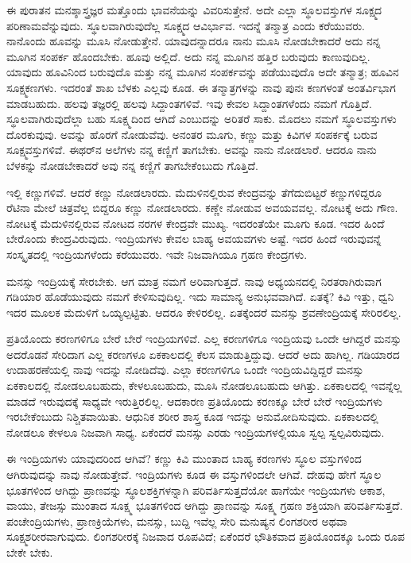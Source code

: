ಈ ಪುರಾತನ ಮನಶ್ಶಾಸ್ತ್ರಜ್ಞರ ಮತ್ತೊಂದು ಭಾವನೆಯನ್ನು ವಿವರಿಸುತ್ತೇನೆ. ಅದೇ ಎಲ್ಲಾ ಸ್ಥೂಲವಸ್ತುಗಳ ಸೂಕ್ಷ್ಮದ ಪರಿಣಾಮವೆನ್ನುವುದು. ಸ್ಥೂಲವಾಗಿರುವುದೆಲ್ಲ ಸೂಕ್ಷ್ಮದ ಆವಿರ್ಭಾವ. ಇದನ್ನೆ ತನ್ಮಾತ್ರ ಎಂದು ಕರೆಯುವರು. ನಾನೊಂದು ಹೂವನ್ನು ಮೂಸಿ ನೋಡುತ್ತೇನೆ. ಯಾವುದನ್ನಾದರೂ ನಾನು ಮೂಸಿ ನೋಡಬೇಕಾದರೆ ಅದು ನನ್ನ ಮೂಗಿನ ಸಂಪರ್ಕ ಹೊಂದಬೇಕು. ಹೂವು ಅಲ್ಲಿದೆ. ಅದು ನನ್ನ ಮೂಗಿನ ಹತ್ತಿರ ಬರುವುದು ಕಾಣುವುದಿಲ್ಲ. ಯಾವುದು ಹೂವಿನಿಂದ ಬರುವುದೊ ಮತ್ತು ನನ್ನ ಮೂಗಿನ ಸಂಪರ್ಕವನ್ನು ಪಡೆಯುವುದೊ ಅದೇ ತನ್ಮಾತ್ರ; ಹೂವಿನ ಸೂಕ್ಷ್ಮಕಣಗಳು. ಇದರಂತೆ ಶಾಖ ಬೆಳಕು ಎಲ್ಲವು ಕೂಡ. ಈ ತನ್ಮಾತ್ರಗಳನ್ನು ನಾವು ಪುನಃ ಕಣಗಳಂತೆ ಅಂತರ್ವಿಭಾಗ ಮಾಡಬಹುದು. ಹಲವು ತಜ್ಞರಲ್ಲಿ ಹಲವು ಸಿದ್ದಾಂತಗಳಿವೆ. ಇವು ಕೇವಲ ಸಿದ್ದಾಂತಗಳೆಂದು ನಮಗೆ ಗೊತ್ತಿದೆ. ಸ್ಥೂಲವಾಗಿರುವುದೆಲ್ಲಾ ಬಹು ಸೂಕ್ಷ್ಮದಿಂದ ಆಗಿದೆ ಎಂಬುದನ್ನು ಅರಿತರೆ ಸಾಕು. ಮೊದಲು ನಮಗೆ ಸ್ಥೂಲವಸ್ತುಗಳು ದೊರಕುವುವು. ಅವನ್ನು ಹೊರಗೆ ನೋಡುವೆವು. ಅನಂತರ ಮೂಗು, ಕಣ್ಣು ಮತ್ತು ಕಿವಿಗಳ ಸಂಪರ್ಕಕ್ಕೆ ಬರುವ ಸೂಕ್ಷ್ಮವಸ್ತುಗಳಿವೆ. ಈಥರ್‌ನ ಅಲೆಗಳು ನನ್ನ ಕಣ್ಣಿಗೆ ತಾಗಬೇಕು. ಅವನ್ನು ನಾನು ನೋಡಲಾರೆ. ಆದರೂ ನಾನು ಬೆಳಕನ್ನು ನೋಡಬೇಕಾದರೆ ಅವು ನನ್ನ ಕಣ್ಣಿಗೆ ತಾಗಬೇಕೆಂಬುದು ಗೊತ್ತಿದೆ.

\newpage

ಇಲ್ಲಿ ಕಣ್ಣುಗಳಿವೆ. ಆದರೆ ಕಣ್ಣು ನೋಡಲಾರದು. ಮೆದುಳಿನಲ್ಲಿರುವ ಕೇಂದ್ರವನ್ನು ತೆಗೆದುಬಿಟ್ಟರೆ ಕಣ್ಣುಗಳಿದ್ದರೂ ರೆಟಿನಾ ಮೇಲೆ ಚಿತ್ರವೆಲ್ಲ ಬಿದ್ದರೂ ಕಣ್ಣು ನೋಡಲಾರದು. ಕಣ್ಣೇ ನೋಡುವ ಅವಯವವಲ್ಲ. ನೋಟಕ್ಕೆ ಅದು ಗೌಣ. ನೋಟಕ್ಕೆ ಮೆದುಳಿನಲ್ಲಿರುವ ನೋಟದ ನರಗಳ ಕೇಂದ್ರವೇ ಮುಖ್ಯ. ಇದರಂತೆಯೇ ಮೂಗು ಕೂಡ. ಇದರ ಹಿಂದೆ ಬೇರೊಂದು ಕೇಂದ್ರವಿರುವುದು. ಇಂದ್ರಿಯಗಳು ಕೇವಲ ಬಾಹ್ಯ ಅವಯವಗಳು ಅಷ್ಟೆ. ಇದರ ಹಿಂದೆ ಇರುವುವನ್ನೆ ಸಂಸ್ಕೃತದಲ್ಲಿ ಇಂದ್ರಿಯಗಳೆಂದು ಕರೆಯುವರು. ಇವೇ ನಿಜವಾಗಿಯೂ ಗ್ರಹಣ ಕೇಂದ್ರಗಳು.

ಮನಸ್ಸು ಇಂದ್ರಿಯಕ್ಕೆ ಸೇರಬೇಕು. ಆಗ ಮಾತ್ರ ನಮಗೆ ಅರಿವಾಗುತ್ತದೆ. ನಾವು ಅಧ್ಯಯನದಲ್ಲಿ ನಿರತರಾಗಿರುವಾಗ ಗಡಿಯಾರ ಹೊಡೆಯುವುದು ನಮಗೆ ಕೇಳಿಸುವುದಿಲ್ಲ. ಇದು ಸಾಮಾನ್ಯ ಅನುಭವವಾಗಿದೆ. ಏತಕ್ಕೆ? ಕಿವಿ ಇತ್ತು, ಧ್ವನಿ ಇದರ ಮೂಲಕ ಮೆದುಳಿಗೆ ಒಯ್ಯಲ್ಪಟ್ಟಿತು. ಆದರೂ ಕೇಳಿರಲಿಲ್ಲ. ಏತಕ್ಕೆಂದರೆ ಮನಸ್ಸು ಶ್ರವಣೇಂದ್ರಿಯಕ್ಕೆ ಸೇರಿರಲಿಲ್ಲ.

ಪ್ರತಿಯೊಂದು ಕರಣಗಳಿಗೂ ಬೇರೆ ಬೇರೆ ಇಂದ್ರಿಯಗಳಿವೆ. ಎಲ್ಲ ಕರಣಗಳಿಗೂ ಇಂದ್ರಿಯವು ಒಂದೇ ಆಗಿದ್ದರೆ ಮನಸ್ಸು ಅದರೊಡನೆ ಸೇರಿದಾಗ ಎಲ್ಲ ಕರಣಗಳೂ ಏಕಕಾಲದಲ್ಲಿ ಕೆಲಸ ಮಾಡುತ್ತಿದ್ದುವು. ಆದರೆ ಅದು ಹಾಗಿಲ್ಲ. ಗಡಿಯಾರದ ಉದಾಹರಣೆಯಲ್ಲಿ ನಾವು ಇದನ್ನು ನೋಡಿದೆವು. ಎಲ್ಲಾ ಕರಣಗಳಿಗೂ ಒಂದೇ ಇಂದ್ರಿಯವಿದ್ದಿದ್ದರೆ ಮನಸ್ಸು ಏಕಕಾಲದಲ್ಲಿ ನೋಡಲೂಬಹುದು, ಕೇಳಲೂಬಹುದು, ಮೂಸಿ ನೋಡಲೂಬಹುದು ಆಗಿತ್ತು. ಏಕಕಾಲದಲ್ಲಿ ಇವನ್ನೆಲ್ಲ ಮಾಡದೆ ಇರುವುದಕ್ಕೆ ಸಾಧ್ಯವೇ ಇರುತ್ತಿರಲಿಲ್ಲ. ಆದಕಾರಣ ಪ್ರತಿಯೊಂದು ಕರಣಕ್ಕೂ ಬೇರೆ ಬೇರೆ ಇಂದ್ರಿಯಗಳು ಇರಬೇಕೆಂಬುದು ನಿಶ್ಚಿತವಾಯಿತು. ಆಧುನಿಕ ಶರೀರ ಶಾಸ್ತ್ರ ಕೂಡ ಇದನ್ನು ಅನುಮೋದಿಸುವುದು. ಏಕಕಾಲದಲ್ಲಿ ನೋಡಲೂ ಕೇಳಲೂ ನಿಜವಾಗಿ ಸಾಧ್ಯ. ಏಕೆಂದರೆ ಮನಸ್ಸು ಎರಡು ಇಂದ್ರಿಯಗಳಲ್ಲಿಯೂ ಸ್ವಲ್ಪ ಸ್ವಲ್ಪವಿರುವುದು.

ಈ ಇಂದ್ರಿಯಗಳು ಯಾವುದರಿಂದ ಆಗಿವೆ? ಕಣ್ಣು ಕಿವಿ ಮುಂತಾದ ಬಾಹ್ಯ ಕರಣಗಳು ಸ್ಥೂಲ ವಸ್ತುಗಳಿಂದ ಆಗಿರುವುದನ್ನು ನಾವು ನೋಡುತ್ತೇವೆ. ಇಂದ್ರಿಯಗಳು ಕೂಡ ಈ ವಸ್ತುಗಳಿಂದಲೇ ಆಗಿವೆ. ದೇಹವು ಹೇಗೆ ಸ್ಥೂಲ ಭೂತಗಳಿಂದ ಆಗಿದ್ದು ಪ್ರಾಣವನ್ನು ಸ್ಥೂಲಶಕ್ತಿಗಳನ್ನಾಗಿ ಪರಿವರ್ತಿಸುತ್ತದೆಯೋ ಹಾಗೆಯೇ ಇಂದ್ರಿಯಗಳು ಆಕಾಶ, ವಾಯು, ತೇಜಸ್ಸು ಮುಂತಾದ ಸೂಕ್ಷ್ಮ ಭೂತಗಳಿಂದ ಆಗಿದ್ದು ಪ್ರಾಣವನ್ನು ಸೂಕ್ಷ್ಮ ಗ್ರಹಣ ಶಕ್ತಿಯಾಗಿ ಪರಿವರ್ತಿಸುತ್ತದೆ. ಪಂಚೇಂದ್ರಿಯಗಳು, ಪ್ರಾಣಕ್ರಿಯೆಗಳು, ಮನಸ್ಸು, ಬುದ್ದಿ ಇವೆಲ್ಲ ಸೇರಿ ಮನುಷ್ಯನ ಲಿಂಗಶರೀರ ಅಥವಾ ಸೂಕ್ಷ್ಮಶರೀರವಾಗುವುದು. ಲಿಂಗಶರೀರಕ್ಕೆ ನಿಜವಾದ ರೂಪವಿದೆ; ಏಕೆಂದರೆ ಭೌತಿಕವಾದ ಪ್ರತಿಯೊಂದಕ್ಕೂ ಒಂದು ರೂಪ ಬೇಕೇ ಬೇಕು.

